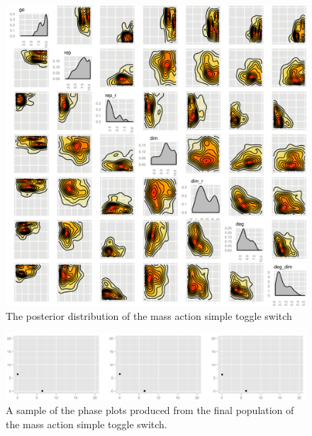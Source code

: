 \begin{figure}[p]
\centering
\includegraphics[scale=0.2]{chapterModelling/mass_action_switches/deterministic/posterior_ma_cl_bi.png}
\caption{The posterior distribution of the mass action simple toggle switch}
\label{fig:det_std}
\end{figure}

\begin{figure}[p]
\centering
\includegraphics[scale=0.3]{chapterModelling/mass_action_switches/deterministic/ma_cl_bi_phase_plot.png}
\caption{A sample of the phase plots produced from the final population of the mass action simple toggle switch.}
\label{fig:det_std_phase}
\end{figure}

